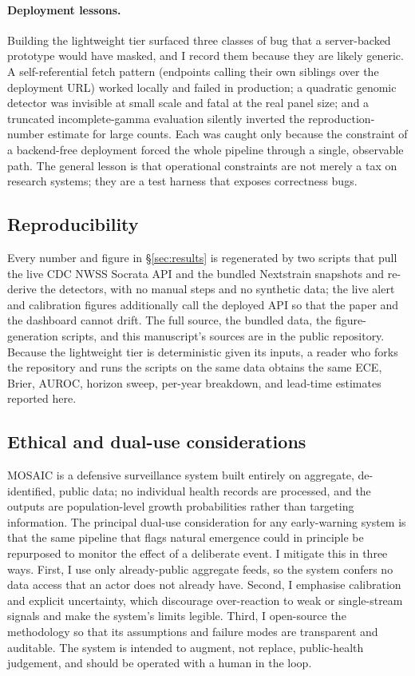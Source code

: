 \documentclass[10pt,twocolumn]{article}
\theoremstyle{definition}
\begin{document}
\paragraph{Deployment lessons.}
Building the lightweight tier surfaced three classes of bug that a server-backed
prototype would have masked, and I record them because they are likely generic.
A self-referential fetch pattern (endpoints calling their own siblings over the
deployment URL) worked locally and failed in production; a quadratic genomic
detector was invisible at small scale and fatal at the real panel size; and a
truncated incomplete-gamma evaluation silently inverted the reproduction-number
estimate for large counts. Each was caught only because the constraint of a
backend-free deployment forced the whole pipeline through a single, observable
path. The general lesson is that operational constraints are not merely a tax on
research systems; they are a test harness that exposes correctness bugs.

\subsection{Reproducibility}
\label{sec:repro}
Every number and figure in \S\ref{sec:results} is regenerated by two scripts that
pull the live CDC NWSS Socrata API and the bundled Nextstrain snapshots and
re-derive the detectors, with no manual steps and no synthetic data; the live
alert and calibration figures additionally call the deployed API so that the paper
and the dashboard cannot drift. The full source, the bundled data, the
figure-generation scripts, and this manuscript's sources are in the public
repository. Because the lightweight tier is deterministic given its inputs, a
reader who forks the repository and runs the scripts on the same data obtains the
same ECE, Brier, AUROC, horizon sweep, per-year breakdown, and lead-time
estimates reported here.

\subsection{Ethical and dual-use considerations}
\label{sec:ethics}

MOSAIC is a defensive surveillance system built entirely on aggregate,
de-identified, public data; no individual health records are processed, and the
outputs are population-level growth probabilities rather than targeting
information. The principal dual-use consideration for any early-warning system is
that the same pipeline that flags natural emergence could in principle be
repurposed to monitor the effect of a deliberate event. I mitigate this in three
ways. First, I use only already-public aggregate feeds, so the system confers no
data access that an actor does not already have. Second, I emphasise calibration
and explicit uncertainty, which discourage over-reaction to weak or single-stream
signals and make the system's limits legible. Third, I open-source the
methodology so that its assumptions and failure modes are transparent and
auditable. The system is intended to augment, not replace, public-health
judgement, and should be operated with a human in the loop.
\end{document}
